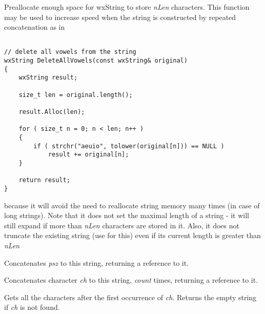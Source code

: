 \label{wxstringalloc}


Preallocate enough space for wxString to store {\it nLen} characters. This function
may be used to increase speed when the string is constructed by repeated
concatenation as in

\begin{verbatim}

// delete all vowels from the string
wxString DeleteAllVowels(const wxString& original)
{
    wxString result;

    size_t len = original.length();

    result.Alloc(len);

    for ( size_t n = 0; n < len; n++ )
    {
        if ( strchr("aeuio", tolower(original[n])) == NULL )
            result += original[n];
    }

    return result;
}

\end{verbatim}

because it will avoid the need to reallocate string memory many times (in case
of long strings). Note that it does not set the maximal length of a string - it
will still expand if more than {\it nLen} characters are stored in it. Also, it
does not truncate the existing string (use 
 for this) even if its current length is
greater than {\it nLen}


\label{wxstringappend}


Concatenates {\it psz} to this string, returning a reference to it.


Concatenates character {\it ch} to this string, {\it count} times, returning a reference
to it.


\label{wxstringafterfirst}


Gets all the characters after the first occurrence of {\it ch}.
Returns the empty string if {\it ch} is not found.


\label{wxstringafterlast}



